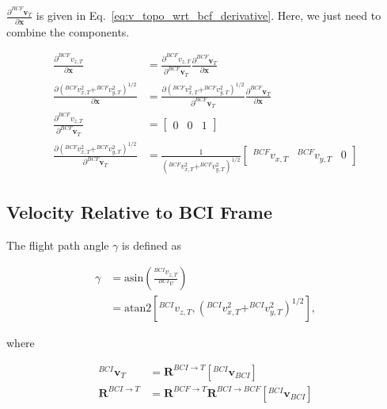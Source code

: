 \documentclass[]{article}
\newcommand{\vb}[1]{\bm{#1}} %
\newcommand{\pd}[2]{\frac{\partial #1}{\partial #2}} %
\begin{document}
$\pd{^{BCF} \vb{v}_T}{\vb{x}}$ is given in Eq.~\eqref{eq:v_topo_wrt_bcf_derivative}. Here, we just need to combine the components.

\begin{align}
	\pd{^{BCF} v_{z, T}}{\vb{x}} &= \pd{^{BCF} v_{z, T}}{^{BCF} \vb{v}_T} \pd{^{BCF} \vb{v}_{T}}{\vb{x}} \\
	\pd{\left( ^{BCF} v_{x, T}^2 + ^{BCF} v_{y, T}^2 \right)^{1/2}}{\vb{x}} &= \pd{\left( ^{BCF} v_{x, T}^2 + ^{BCF} v_{y, T}^2 \right)^{1/2}}{^{BCF} \vb{v}_T} \pd{^{BCF} \vb{v}_{T}}{\vb{x}} \\
	\pd{^{BCF} v_{z, T}}{^{BCF} \vb{v}_T} &= \left[ \begin{array}{ccc} 0 & 0 & 1 \end{array} \right] \\
	\pd{\left( ^{BCF} v_{x, T}^2 + ^{BCF} v_{y, T}^2 \right)^{1/2}}{^{BCF} \vb{v}_T} &= \frac{1}{\left( ^{BCF} v_{x, T}^2 + ^{BCF} v_{y, T}^2 \right)^{1/2}} \left[ \begin{array}{ccc} ^{BCF} v_{x, T} & ^{BCF} v_{y, T} & 0 \end{array} \right]
\end{align}

\subsection{Velocity Relative to BCI Frame}

The flight path angle $\gamma$ is defined as

\begin{align}
\gamma &= \mathrm{asin} \left( \frac{^{BCI} v_{z, T}}{^{BCI} v} \right) \\
&= \mathrm{atan2} \left[ ^{BCI} v_{z, T}, \left( ^{BCI} v_{x,T}^2 + ^{BCI} v_{y, T}^2 \right)^{1/2} \right],
\end{align}

\noindent where

\begin{align}
^{BCI} \vb{v}_{T} &= \vb{R}^{BCI \rightarrow T} \left[ ^{BCI} \vb{v}_{BCI} \right] \\
\vb{R}^{BCI \rightarrow T} &= \vb{R}^{BCF \rightarrow T} \vb{R}^{BCI \rightarrow BCF} \left[^{BCI} \vb{v}_{BCI} \right]
\end{align}

\end{document}
